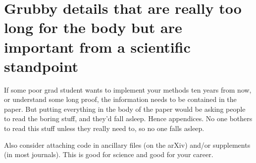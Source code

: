 \documentclass[reprint, aps, prd, letterpaper, noshowpacs, amsmath, %
amssymb, amsfonts, nofootinbib, floatfix, superscriptaddress, %
twoside]{revtex4-1}
\begin{document}
\section{Grubby details that are really too long for the body but are
  important from a scientific standpoint}
\label{sec:GrubbyDetails}

If some poor grad student wants to implement your methods ten years
from now, or understand some long proof, the information needs to be
contained in the paper.  But putting everything in the body of the
paper would be asking people to read the boring stuff, and they'd fall
asleep.  Hence appendices.  No one bothers to read this stuff unless
they really need to, so no one falls asleep.

Also consider attaching code in ancillary files (on the arXiv) and/or
supplements (in most journals).  This is good for science and good for
your career.



\vfil


\let\c\Originalcdefinition
\let\d\Originalddefinition
\let\i\Originalidefinition



\end{document}

